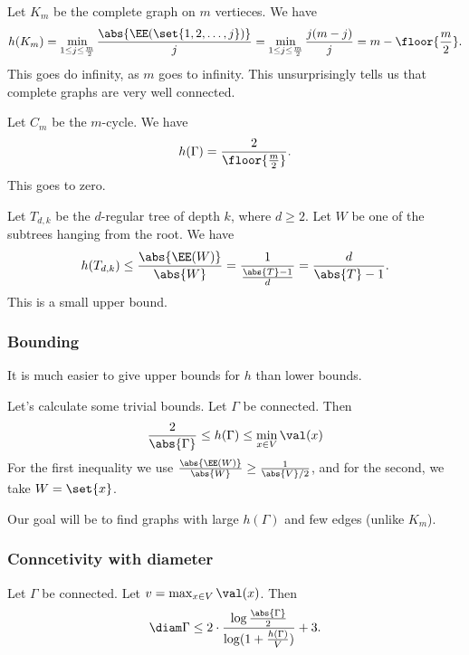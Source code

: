 
\begin{example}
    Let $K_m$ be the complete graph on $m$ vertieces.
    We have
    \[
        h(K_m) = \min_{1 \le j \le \frac{m}{2}} 
        \frac{\abs{\EE(\set{1,2, \dots, j})}}{j} = 
        \min_{1 \le j \le \frac{m}{2}} 
        \frac{j(m-j)}{j} = m - \floor{\frac{m}{2}}.
    \]
    This goes do infinity, as $m$ goes to infinity. This 
    unsurprisingly tells us that complete graphs are very
    well connected.
\end{example}

\begin{example}
    Let $C_m$ be the $m$-cycle. We have
    \[
        h(\Gamma) = \frac{2}{\floor{\frac{m}{2}}}.
    \]
    This goes to zero.
\end{example}

\begin{example}
    Let $T_{d, k}$ be the $d$-regular tree of depth 
    $k$, where $d \ge 2$. Let $W$ be one 
    of the subtrees hanging from the root. We have
    \[
        h(T_{d,k}) \le \frac{\abs{\EE(W)}}{\abs{W}} 
        = \frac{1}{\frac{\abs{T}-1}{d}} = 
        \frac{d}{\abs{T}-1}.
    \]
    This is a small upper bound.
\end{example}

\subsubsection*{Bounding}

\begin{remark}
    It is much easier to give upper bounds for $h$
    than lower bounds.
\end{remark}

Let's calculate some trivial bounds. Let $\Gamma$ be
connected. Then
\[
    \frac{2}{\abs{\Gamma}} \le h(\Gamma) 
    \le \min_{x\in V}\val(x)
\]
For the first inequality we use 
$\frac{\abs{\EE(W)}}{\abs{W}} \ge
 \frac{1}{\abs{V}/2}$,
and for the second, we take $W = \set{x}$.

Our goal will be to find graphs with large 
$h(\Gamma)$ and few edges (unlike $K_m$).

\subsubsection*{Conncetivity with diameter}

\begin{proposition}
    Let $\Gamma$ be connected. 
    Let $v = \max_{x \in V} \val(x)$. Then
    \[
        \diam\Gamma \le 2 \cdot 
        \frac{\log\frac{\abs{\Gamma}}{2}}
        {\log(1+\frac{h(\Gamma)}{V})} + 3.
    \]
\end{proposition}

